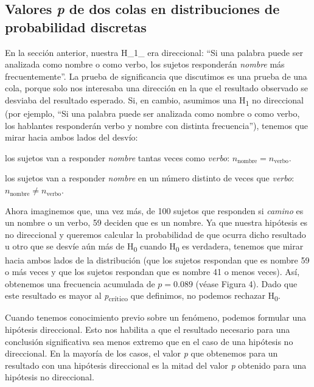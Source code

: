 \documentclass[12pt,spanish,a4paper,]{article}
\providecommand{\tightlist}{%
  \setlength{\itemsep}{0pt}\setlength{\parskip}{0pt}}
\begin{document}
\hypertarget{valores-p-de-dos-colas-en-distribuciones-de-probabilidad-discretas}{%
\subsection{\texorpdfstring{Valores \emph{p} de dos colas en
distribuciones de probabilidad
discretas}{Valores p de dos colas en distribuciones de probabilidad discretas}}\label{valores-p-de-dos-colas-en-distribuciones-de-probabilidad-discretas}}

En la sección anterior, nuestra H\_1\_ era direccional: ``Si una palabra
puede ser analizada como nombre o como verbo, los sujetos responderán
\emph{nombre} más frecuentemente''. La prueba de significancia que
discutimos es una prueba de una cola, porque solo nos interesaba una
dirección en la que el resultado observado se desviaba del resultado
esperado. Si, en cambio, asumimos una H\textsubscript{1} no direccional
(por ejemplo, ``Si una palabra puede ser analizada como nombre o como
verbo, los hablantes responderán verbo y nombre con distinta
frecuencia''), tenemos que mirar hacia ambos lados del desvío:

\begin{description}
\tightlist
\item[H\textsubscript{0} estadística]
los sujetos van a responder \emph{nombre} tantas veces como
\emph{verbo}: \(n_{\textrm{nombre}} = n_{\textrm{verbo}}\).
\item[H\textsubscript{1} estadística]
los sujetos van a responder \emph{nombre} en un número distinto de veces
que \emph{verbo}: \(n_{\textrm{nombre}} \neq n_{\textrm{verbo}}\).
\end{description}

Ahora imaginemos que, una vez más, de 100 sujetos que responden si
\emph{camino} es un nombre o un verbo, 59 deciden que es un nombre. Ya
que nuestra hipótesis es no direccional y queremos calcular la
probabilidad de que ocurra dicho resultado u otro que se desvíe aún más
de H\textsubscript{0} cuando H\textsubscript{0} es verdadera, tenemos
que mirar hacia ambos lados de la distribución (que los sujetos
respondan que es nombre 59 o más veces y que los sujetos respondan que
es nombre 41 o menos veces). Así, obtenemos una frecuencia acumulada de
\(p = 0.089\) (véase Figura 4). Dado que este resultado es mayor al
\emph{p}\textsubscript{crítico} que definimos, no podemos rechazar
H\textsubscript{0}.

Cuando tenemos conocimiento previo sobre un fenómeno, podemos formular
una hipótesis direccional. Esto nos habilita a que el resultado
necesario para una conclusión significativa sea menos extremo que en el
caso de una hipótesis no direccional. En la mayoría de los casos, el
valor \emph{p} que obtenemos para un resultado con una hipótesis
direccional es la mitad del valor \emph{p} obtenido para una hipótesis
no direccional.
\end{document}
